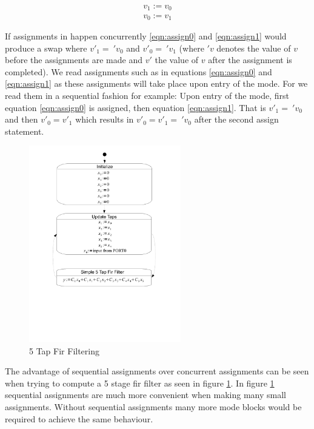 \begin{align}
v_1 := v_0 \label{eqn:assign0} \\ 
v_0 := v_1 \label{eqn:assign1}
\end{align}

If assignments in  happen concurrently \ref{eqn:assign0} and \ref{eqn:assign1} would produce a swap where $v'_1 =\: 'v_0$ and $v'_0 =\: 'v_1$ (where $'v$ denotes the value of $v$ before the assignments are made and $v'$ the value of $v$ after the assignment is completed). We read assignments such as in equations \ref{eqn:assign0} and \ref{eqn:assign1} as these assignments will take place upon entry of the mode. For  we read them in a sequential fashion for example: Upon entry of the mode, first equation \ref{eqn:assign0} is assigned, then equation \ref{eqn:assign1}. That is $v'_1 =\: 'v_0$ and then $v'_0 = v'_1$ which results in $v'_0 = v'_1 =\: 'v_0$ after the second assign statement.

\begin{figure}[htp]
    \centering
    \includegraphics[trim= 10mm 70mm 10mm 10mm, clip, width=250px]{./images/state_uml2_fir.pdf}
    \caption{5 Tap Fir Filtering}
    \label{fig:state_uml2_fir}
\end{figure}

The advantage of sequential assignments over concurrent assignments can be seen when trying to compute a 5 stage fir filter as seen in figure \ref{fig:state_uml2_fir}. In figure \ref{fig:state_uml2_fir} sequential assignments are much more convenient when making many small assignments. Without sequential assignments many more mode blocks would be required to achieve the same behaviour.




